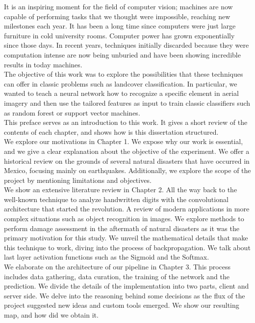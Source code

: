 It is an inspiring moment for the field of computer vision; machines are now capable of performing tasks that we thought were impossible, reaching new milestones each year. It has been a long time since computers were just large furniture in cold university rooms. Computer power has grown exponentially since those days. In recent years, techniques initially discarded because they were computation intense are now being unburied and have been showing incredible results in today machines.\\

The objective of this work was to explore the possibilities that these techniques can offer in classic problems such as landcover classification. In particular, we wanted to teach a neural network how to recognize a specific element in aerial imagery and then use the tailored features as input to train classic classifiers such as random forest or support vector machines.\\

This preface serves as an introduction to this work. It gives a short review of the contents of each chapter, and shows how is this dissertation structured.\\

We explore our motivations in Chapter 1. We expose why our work is essential, and we give a clear explanation about the objective of the experiment. We offer a historical review on the grounds of several natural disasters that have occurred in Mexico, focusing mainly on earthquakes. Additionally, we explore the scope of the project by mentioning limitations and objectives.\\

We show an extensive literature review in Chapter 2. All the way back to the well-known technique to analyze handwritten digits with the convolutional architecture that started the revolution. A review of modern applications in more complex situations such as object recognition in images. We explore methods to perform damage assessment in the aftermath of natural disasters as it was the primary motivation for this study. We unveil the mathematical details that make this technique to work, diving into the process of backpropagation. We talk about last layer activation functions such as the Sigmoid and the Softmax.\\

We elaborate on the architecture of our pipeline in Chapter 3. This process includes data gathering, data curation, the training of the network and the prediction. We divide the details of the implementation into two parts, client and server side. We delve into the reasoning behind some decisions as the flux of the project suggested new ideas and custom tools emerged. We show our resulting map, and how did we obtain it.\\

